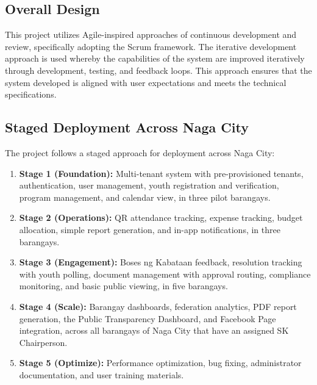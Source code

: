 \subsection{Overall Design}
\label{subsec:overall_design}

\hspace*{\parindent}This project utilizes Agile-inspired approaches of continuous development and review, specifically adopting the Scrum framework. The iterative development approach is used whereby the capabilities of the system are improved iteratively through development, testing, and feedback loops. This approach ensures that the system developed is aligned with user expectations and meets the technical specifications.
\vspace{5mm}

\subsection{Staged Deployment Across Naga City}
\label{subsec:phased_deployment}

\hspace*{\parindent}The project follows a staged approach for deployment across Naga City:
\vspace{5mm}

\begin{enumerate}
    \item \textbf{Stage 1 (Foundation):} Multi-tenant system with pre-provisioned tenants, authentication, user management, youth registration and verification, program management, and calendar view, in three pilot barangays.
    \item \textbf{Stage 2 (Operations):} QR attendance tracking, expense tracking, budget allocation, simple report generation, and in-app notifications, in three barangays.
    \item \textbf{Stage 3 (Engagement):} Boses ng Kabataan feedback, resolution tracking with youth polling, document management with approval routing, compliance monitoring, and basic public viewing, in five barangays.
    \item \textbf{Stage 4 (Scale):} Barangay dashboards, federation analytics, PDF report generation, the Public Transparency Dashboard, and Facebook Page integration, across all barangays of Naga City that have an assigned SK Chairperson.
    \item \textbf{Stage 5 (Optimize):} Performance optimization, bug fixing, administrator documentation, and user training materials.
\end{enumerate}
\vspace{5mm}

